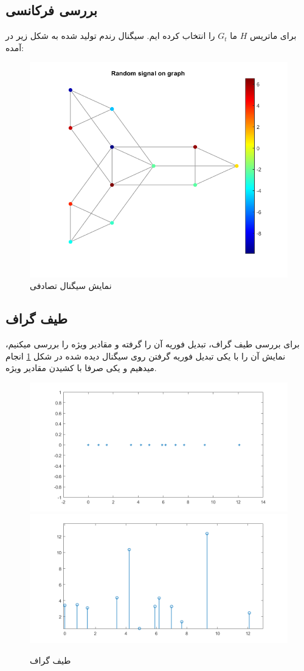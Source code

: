 \clearpage

\subsection{بررسی فرکانسی}

برای ماتریس $H$ ما $G_t$ را انتخاب کرده ایم.
سیگنال رندم تولید شده به شکل زیر در آمده:

\begin{figure}[h]
	\centering
	\includegraphics*[width=0.5\linewidth]{../results/Q1/random_sig.png}
	\caption{نمایش سیگنال تصادفی}
	\label{fig:signal}
\end{figure}


\subsection{طیف گراف}

برای بررسی طیف گراف، تبدیل فوریه آن را گرفته و مقادیر ویژه را بررسی میکنیم، نمایش آن را با
یکی تبدیل فوریه گرفتن روی سیگنال دیده شده در شکل \ref*{fig:signal} انجام میدهیم و یکی صرفا با کشیدن
مقادیر ویژه.

\begin{figure}[h!]
	\centering
	\includegraphics*[width=0.6\linewidth]{../results/Q1/spectrum.png}
	\includegraphics*[width=0.6\linewidth]{../results/Q1/sig_frequencies.png}
	\caption{طیف گراف}
	\label{fig:spectrum}
\end{figure}

